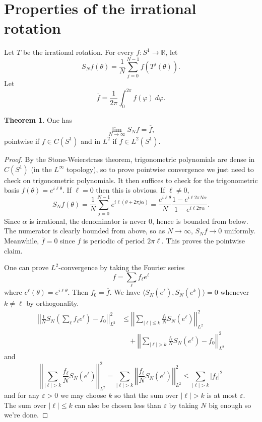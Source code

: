 \documentclass[12pt]{report}
\newcommand{\RR}{\mathbb{R}}
\theoremstyle{definition}
\newtheorem{theorem}{Theorem}[chapter]
\begin{document}
\section{Properties of the irrational rotation}
Let $T$ be the irrational rotation. For every $f: S^1 \to \RR$, let
$$S_Nf(\theta) = \frac{1}{N} \sum_{j=0}^{N-1} f(T^j(\theta)).$$
Let
$$\overline f = \frac{1}{2\pi} \int_0^{2\pi} f(\varphi) ~d\varphi.$$
\begin{theorem}
One has
$$\lim_{N \to \infty} S_Nf = \overline f,$$
pointwise if $f \in C(S^1)$ and in $L^2$ if $f \in L^2(S^1)$.
\end{theorem}
\begin{proof}
By the Stone-Weierstrass theorem, trigonometric polynomials are dense in $C(S^1)$ (in the $L^\infty$ topology), so to prove pointwise convergence we just need to check on trigonometric polynomials. It then suffices to check for the trigonometric basis $f(\theta) = e^{i\ell\theta}$. If $\ell = 0$ then this is obvious. If $\ell \neq 0$,
$$S_Nf(\theta) = \frac{1}{N} \sum_{j=0}^{N-1} e^{i\ell(\theta + 2\pi j\alpha)} = \frac{e^{i\ell\theta}}{N} \frac{1 - e^{i\ell2\pi N\alpha}}{1 - e^{i\ell2\pi\alpha}}.$$
Since $\alpha$ is irrational, the denominator is never $0$, hence is bounded from below. The numerator is clearly bounded from above, so as $N \to \infty$, $S_Nf \to 0$ uniformly. Meanwhile, $\overline f = 0$ since $f$ is periodic of period $2\pi\ell$. This proves the pointwise claim.

One can prove $L^2$-convergence by taking the Fourier series
$$f = \sum_\ell f_\ell e^\ell$$
where $e^\ell(\theta) = e^{i\ell\theta}$.
Then $f_0 = \overline f$. We have $\langle S_N(e^\ell), S_N(e^k)\rangle = 0$ whenever $k \neq \ell$ by orthogonality.
\begin{align*}\left|\left|\frac{1}{N} S_N\left(\sum_\ell f_\ell e^\ell\right) - f_0\right|\right|_{L^2}^2 &\leq \left|\left|\sum_{|\ell| \leq k} \frac{f_\ell}{N} S_N(e^\ell)\right|\right|_{L^2}^2\\&\quad + \left|\left|\sum_{|\ell| > k} \frac{f_\ell}{N} S_N(e^\ell) - f_0\right|\right|_{L^2}^2
\end{align*}
and
$$ \left|\left|\sum_{|\ell| > k} \frac{f_\ell}{N} S_N(e^\ell)\right|\right|_{L^2}^2 = \sum_{|\ell| > k} \left|\left|\frac{f_\ell}{N} S_N(e^\ell)\right|\right|^2_{L^2} \leq \sum_{|\ell| > k} |f_\ell|^2$$
and for any $\varepsilon > 0$ we may choose $k$ so that the sum over $|\ell| > k$ is at most $\varepsilon$. The sum over $|\ell| \leq k$ can also be chosen less than $\varepsilon$ by taking $N$ big enough so we're done.
\end{proof}
\end{document}
